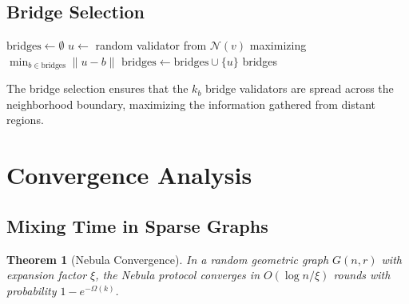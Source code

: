 \documentclass[11pt,a4paper]{article}
\newtheorem{theorem}{Theorem}[section]
\begin{document}
\subsection{Bridge Selection}

\begin{algorithm}[H]
\caption{Nebula Bridge Selection}
\label{alg:nebula-bridge}
\begin{algorithmic}[1]
    \State $\text{bridges} \gets \emptyset$
    \State {}
        \State $u \gets$ random validator from $\mathcal{N}(v)$ maximizing $\min_{b \in \text{bridges}} \|u - b\|$
        \State $\text{bridges} \gets \text{bridges} \cup \{u\}$
    \EndFor
    \State \Return bridges
\EndFunction
\end{algorithmic}
\end{algorithm}

The bridge selection ensures that the $k_b$ bridge validators are spread across
the neighborhood boundary, maximizing the information gathered from distant regions.

\section{Convergence Analysis}
\label{sec:convergence}

\subsection{Mixing Time in Sparse Graphs}

\begin{theorem}[Nebula Convergence]
\label{thm:nebula-convergence}
In a random geometric graph $G(n, r)$ with expansion factor $\xi$, the Nebula protocol
converges in $O(\log n / \xi)$ rounds with probability $1 - e^{-\Omega(k)}$.
\end{theorem}
\end{document}
